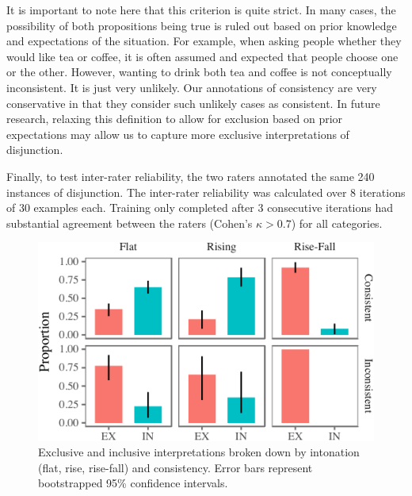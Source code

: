 \documentclass[10pt, letterpaper]{article}
\newenvironment{CodeChunk}{}{}
\begin{document}
It is important to note here that this criterion is quite strict. In
many cases, the possibility of both propositions being true is ruled out
based on prior knowledge and expectations of the situation. For example,
when asking people whether they would like tea or coffee, it is often
assumed and expected that people choose one or the other. However,
wanting to drink both tea and coffee is not conceptually inconsistent.
It is just very unlikely. Our annotations of consistency are very
conservative in that they consider such unlikely cases as consistent. In
future research, relaxing this definition to allow for exclusion based
on prior expectations may allow us to capture more exclusive
interpretations of disjunction.

Finally, to test inter-rater reliability, the two raters annotated the
same 240 instances of disjunction. The inter-rater reliability was
calculated over 8 iterations of 30 examples each. Training only
completed after 3 consecutive iterations had substantial agreement
between the raters (Cohen's \(\kappa > 0.7\)) for all categories.

\begin{CodeChunk}
\begin{figure}[t]

{\centering \includegraphics{figs/interpretationByIntonationAndConsistency-1} 

}

\caption[Exclusive and inclusive interpretations broken down by intonation (flat, rise, rise-fall) and consistency]{Exclusive and inclusive interpretations broken down by intonation (flat, rise, rise-fall) and consistency. Error bars represent bootstrapped 95\% confidence intervals.}\label{fig:interpretationByIntonationAndConsistency}
\end{figure}
\end{CodeChunk}
\end{document}
